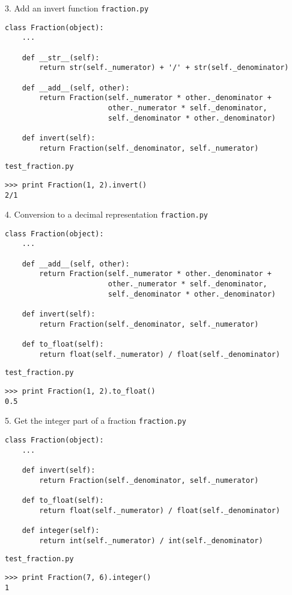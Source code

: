 \documentclass{beamer}
\begin{document}
\begin{frame}[fragile]{3. Add an invert function}
\small
\texttt{fraction.py}
\begin{verbatim}
class Fraction(object):
    ...

    def __str__(self):
        return str(self._numerator) + '/' + str(self._denominator)

    def __add__(self, other):
        return Fraction(self._numerator * other._denominator +
                        other._numerator * self._denominator,
                        self._denominator * other._denominator)

    def invert(self):
        return Fraction(self._denominator, self._numerator)
\end{verbatim}

\vfill

\texttt{test\_fraction.py}
\begin{verbatim}
>>> print Fraction(1, 2).invert()
2/1
\end{verbatim}
\end{frame}

\begin{frame}[fragile]{4. Conversion to a decimal representation}
\small
\texttt{fraction.py}
\begin{verbatim}
class Fraction(object):
    ...

    def __add__(self, other):
        return Fraction(self._numerator * other._denominator +
                        other._numerator * self._denominator,
                        self._denominator * other._denominator)

    def invert(self):
        return Fraction(self._denominator, self._numerator)

    def to_float(self):
        return float(self._numerator) / float(self._denominator)
\end{verbatim}

\vfill

\texttt{test\_fraction.py}
\begin{verbatim}
>>> print Fraction(1, 2).to_float()
0.5
\end{verbatim}
\end{frame}

\begin{frame}[fragile]{5. Get the integer part of a fraction}
\small
\texttt{fraction.py}
\begin{verbatim}
class Fraction(object):
    ...

    def invert(self):
        return Fraction(self._denominator, self._numerator)

    def to_float(self):
        return float(self._numerator) / float(self._denominator)

    def integer(self):
        return int(self._numerator) / int(self._denominator)
\end{verbatim}

\vfill

\texttt{test\_fraction.py}
\begin{verbatim}
>>> print Fraction(7, 6).integer()
1
\end{verbatim}
\end{frame}
\end{document}
